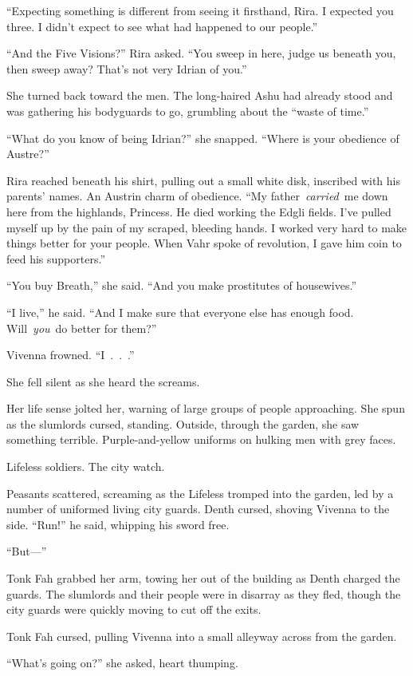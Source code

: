 “Expecting something is different from seeing it firsthand, Rira. I expected you three. I didn’t expect to see what had happened to our people.”

“And the Five Visions?” Rira asked. “You sweep in here, judge us beneath you, then sweep away? That’s not very Idrian of you.”

She turned back toward the men. The long-haired Ashu had already stood and was gathering his bodyguards to go, grumbling about the “waste of time.”

“What do you know of being Idrian?” she snapped. “Where is your obedience of Austre?”

Rira reached beneath his shirt, pulling out a small white disk, inscribed with his parents’ names. An Austrin charm of obedience. “My father~\textit{carried}~me down here from the highlands, Princess. He died working the Edgli fields. I’ve pulled myself up by the pain of my scraped, bleeding hands. I worked very hard to make things better for your people. When Vahr spoke of revolution, I gave him coin to feed his supporters.”

“You buy Breath,” she said. “And you make prostitutes of housewives.”

“I live,” he said. “And I make sure that everyone else has enough food. Will~\textit{you}~do better for them?”

Vivenna frowned. “I~.~.~.”

She fell silent as she heard the screams.

Her life sense jolted her, warning of large groups of people approaching. She spun as the slumlords cursed, standing. Outside, through the garden, she saw something terrible. Purple-and-yellow uniforms on hulking men with grey faces.

Lifeless soldiers. The city watch.

Peasants scattered, screaming as the Lifeless tromped into the garden, led by a number of uniformed living city guards. Denth cursed, shoving Vivenna to the side. “Run!” he said, whipping his sword free.

“But—”

Tonk Fah grabbed her arm, towing her out of the building as Denth charged the guards. The slumlords and their people were in disarray as they fled, though the city guards were quickly moving to cut off the exits.

Tonk Fah cursed, pulling Vivenna into a small alleyway across from the garden.

“What’s going on?” she asked, heart thumping.

